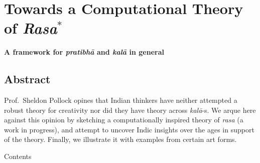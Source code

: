 \chapter[Towards a Computational Theory of \textsl{Rasa}]{Towards a Computational Theory of \textsl{Rasa}$^{*}$}\label{chapter\thechapter:begin}

\begin{center}
{\bf A framework for \textsl{pratibhā} and \textsl{kalā} in general}
\end{center}


\section*{Abstract}

Prof.\ Sheldon Pollock opines that Indian thinkers have neither attempted a robust theory for creativity nor did they have theory across \hbox{\textsl{kalā}-s}. We arque here against this opinion by sketching a computationally inspired theory of \textsl{rasa} (a work in progress), and attempt to uncover Indic insights over the ages in support of the theory. Finally, we illustrate it with examples from certain art forms.

\bigskip
\noindent
{\large Contents}

